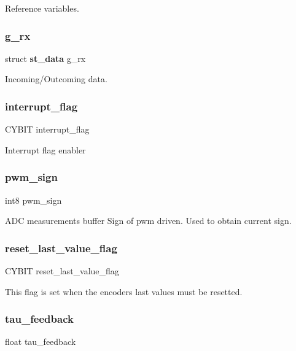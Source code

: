 Reference variables. \mbox{\label{globals_8h_aa963ce8fafc11e104eb7ee22982d0345}} 
\subsubsection{g\+\_\+rx}
{\footnotesize\ttfamily struct \textbf{ st\+\_\+data} g\+\_\+rx}

Incoming/\+Outcoming data. \mbox{\label{globals_8h_a1e6fda88dfdabc63859f8907eb702920}} 
\subsubsection{interrupt\+\_\+flag}
{\footnotesize\ttfamily C\+Y\+B\+IT interrupt\+\_\+flag}

Interrupt flag enabler \mbox{\label{globals_8h_a8ac7ad7c894db750e93bc745818e26ca}} 
\subsubsection{pwm\+\_\+sign}
{\footnotesize\ttfamily int8 pwm\+\_\+sign}

A\+DC measurements buffer Sign of pwm driven. Used to obtain current sign. \mbox{\label{globals_8h_aa89a782cfe75ce7970236babd308fe69}} 
\subsubsection{reset\+\_\+last\+\_\+value\+\_\+flag}
{\footnotesize\ttfamily C\+Y\+B\+IT reset\+\_\+last\+\_\+value\+\_\+flag}

This flag is set when the encoders last values must be resetted. \mbox{\label{globals_8h_a894b799ffe45f442a6a897580ab7e98e}} 
\subsubsection{tau\+\_\+feedback}
{\footnotesize\ttfamily float tau\+\_\+feedback}

